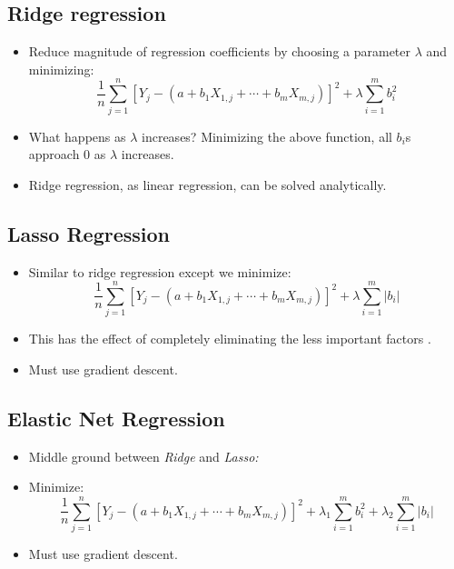 \subsection{Ridge regression}

\begin{itemize}
    \item Reduce magnitude of regression coefficients by choosing a parameter $\lambda $ and minimizing:
    \begin{equation*}
        \frac{1}{n}\sum\limits _{j=1}^{n}\left[ Y_{j} -\left(a+b_{1} X_{1,j} +\cdots +b_{m} X_{m,j}\right)\right]^{2} +\lambda \sum _{i=1}^{m} b_{i}^{2}
    \end{equation*}
    \item What happens as $\lambda $ increases? Minimizing the above function, all $b_{i}$s approach 0 as $\lambda $ increases.
    \item Ridge regression, as linear regression, can be solved analytically.
\end{itemize}

\subsection{Lasso Regression}

\begin{itemize}
    \item Similar to ridge regression except we minimize:
    \begin{equation*}
        \frac{1}{n}\sum\limits _{j=1}^{n}\left[ Y_{j} -\left(a+b_{1} X_{1,j} +\cdots +b_{m} X_{m,j}\right)\right]^{2} +\lambda \sum _{i=1}^{m}\left| b_{i}\right| 
    \end{equation*}
    \item This has the effect of completely eliminating the less important factors .
    \item Must use gradient descent.
\end{itemize}

\subsection{Elastic Net Regression}

\begin{itemize}
    \item Middle ground between \textit{Ridge} and \textit{Lasso:}
    \item Minimize:
    \begin{equation*}
        \frac{1}{n}\sum\limits _{j=1}^{n}[ Y_{j} -(a+b_{1} X_{1,j} +\cdots +b_{m} X_{m,j})]^{2} +\lambda _{1}\sum _{i=1}^{m} b_{i}^{2} +\lambda _{2}\sum _{i=1}^{m}| b_{i}| 
    \end{equation*}
    \item Must use gradient descent.
\end{itemize}

